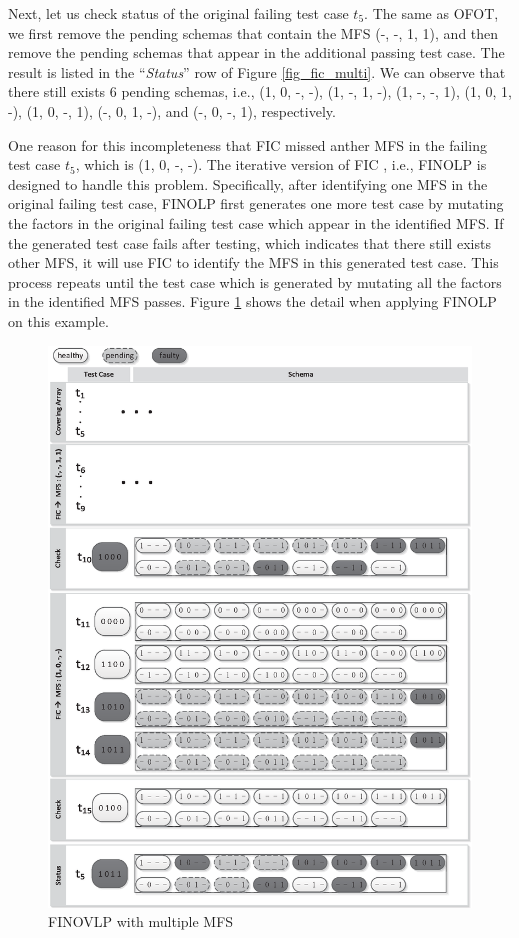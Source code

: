 Next, let us check status of the original failing test case $t_{5}$. The same as OFOT, we first remove the pending schemas that contain the MFS (-, -, 1, 1), and then remove the pending schemas that appear in the additional passing test case. The result is listed in the ``\emph{Status}'' row of Figure \ref{fig_fic_multi}. We can observe that there still exists 6 pending schemas, i.e., (1, 0, -, -), (1, -, 1, -), (1, -, -, 1), (1, 0, 1, -), (1, 0, -, 1), (-, 0, 1, -), and (-, 0, -, 1), respectively.

One reason for this incompleteness that FIC missed anther MFS in the failing test case $t_{5}$, which is (1, 0, -, -). The iterative version of FIC \cite{zhang2011characterizing}, i.e., FINOLP is designed to handle this problem. Specifically, after identifying one MFS in the original failing test case,  FINOLP first generates one more test case by mutating the factors in the original failing test case which appear in the identified MFS. If the generated test case fails after testing, which indicates that there still exists other MFS, it will use FIC to identify the MFS in this generated test case. This process repeats until the test case which is generated by mutating all the factors in the identified MFS passes. Figure \ref{fig_finovlp_multi} shows the detail when applying FINOLP on this example.

\begin{figure}[!htb]
 \centering
 \includegraphics[width=5.3in]{finovlp.eps}
 \caption{FINOVLP with multiple MFS}
 \label{fig_finovlp_multi}
\end{figure}

